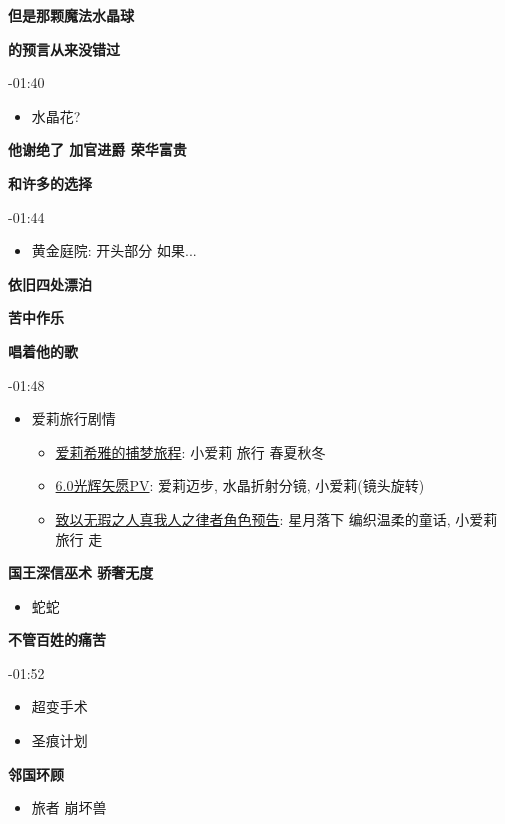 \documentclass[a4paper]{article}
\begin{document}
\textbf{但是那颗魔法水晶球}

\textbf{的预言从来没错过}

-01:40

\begin{itemize}
    \item 水晶花?
\end{itemize}

\textbf{他谢绝了 加官进爵 荣华富贵}

\textbf{和许多的选择}

-01:44

\begin{itemize}
    \item 黄金庭院: 开头部分 如果...
\end{itemize}

\textbf{依旧四处漂泊}

\textbf{苦中作乐}

\textbf{唱着他的歌}

-01:48

\begin{itemize}
    \item 爱莉旅行剧情
    \begin{itemize}
        \item \href{https://www.bilibili.com/video/BV1ZW4y1t7Zf/}{爱莉希雅的捕梦旅程}: 小爱莉 旅行 春夏秋冬
        \item \href{https://www.bilibili.com/video/BV1Mg411k7U5/}{6.0光辉矢愿PV}: 爱莉迈步, 水晶折射分镜, 小爱莉(镜头旋转)
        \item \href{https://www.bilibili.com/video/BV1DS4y1t7rs/}{致以无瑕之人真我人之律者角色预告}: 星月落下 编织温柔的童话, 小爱莉 旅行 走
    \end{itemize}
\end{itemize}

\textbf{国王深信巫术 骄奢无度}

\begin{itemize}
    \item 蛇蛇
\end{itemize}

\textbf{不管百姓的痛苦}

-01:52

\begin{itemize}
    \item 超变手术
    \item 圣痕计划
\end{itemize}

\textbf{邻国环顾}

\begin{itemize}
    \item 旅者 崩坏兽
\end{itemize}
\end{document}
